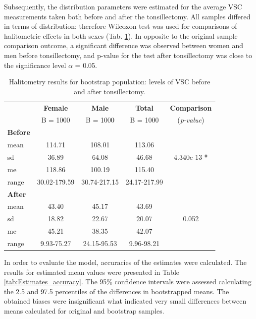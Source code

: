 \documentclass[12pt,a4paper,notitlepage]{report}
\begin{document}
Subsequently, the distribution parameters were estimated for the average VSC measurements taken both before and after the tonsillectomy. All samples differed in terms of distribution; therefore Wilcoxon test  was used for comparisons of halitometric effects in both sexes (Tab. \ref{tab:Halitometry_results_boot}). In opposite to the original sample comparison outcome, a significant difference was observed between women and men before tonsillectomy, and p-value for the test after tonsillectomy was close to the significance level $\alpha$ = 0.05.


\begin{table}
\centering
	\begin{tabular}{lcccc}
	\hline 				& \textbf{Female} & \textbf{Male} 	& \textbf{Total} 	&  \textbf{Comparison}  \\
	 				 	& B = 1000 		& B = 1000 		& B = 1000 		&  (\textit{p-value}) \\
	\hline
	\hline
	\bf{Before}			&			&			&			&		\\
	\indent mean			& 114.71		& 108.01		& 113.06		& 		\\
	\indent sd				& 36.89		& 64.08		& 46.68		& 4.340e-13 *\\
	\indent me			& 118.86		& 100.19		& 115.40		& 		\\
	\indent range			& 30.02-179.59 & 30.74-217.15 & 24.17-217.99&		 \\ 
	\hline
	
	\bf{After}				&			&			&			&		\\
	\indent mean			& 43.40		& 45.17		& 43.69		&		\\
	\indent sd				& 18.82		& 22.67		& 20.07		& 0.052	\\
	\indent me			& 45.21		& 38.35		& 42.07		&		\\
	\indent range			& 9.93-75.27	& 24.15-95.53	& 9.96-98.21	&		\\ 
	\hline
	\end{tabular}
	\caption{Halitometry results for bootstrap population: levels of VSC before and after tonsillectomy.}
	\label{tab:Halitometry_results_boot}
\end{table}

In order to evaluate the model, accuracies of the estimates were calculated. The results for estimated mean values were presented in Table \ref{tab:Estimates_accuracy}. The 95\% confidence intervals were assessed calculating the 2.5 and 97.5 percentiles of the differences in bootstrapped means. The obtained biases were insignificant what indicated very small differences between means calculated for original and bootstrap samples.
\end{document}

